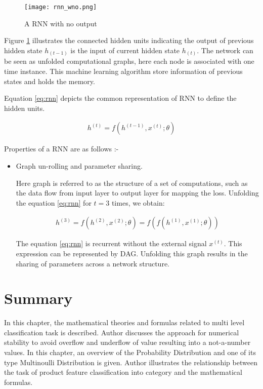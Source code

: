 \begin{figure}[H]
    \centering    
    \texttt{[image: rnn\_wno.png]}
    \caption{A \acl*{RNN} with no output \parencite[Page 370]{Goodfellow-et-al-2016}}
    \label{fig:RNN without output}
\end{figure}


Figure \ref{fig:RNN without output} illustrates the connected hidden units indicating the output of previous hidden state $h_{(t-1)}$ is the input of current hidden state $h_{(t)}$.  The network can be seen as unfolded computational graphs, here each node is associated with one time instance. This machine learning algorithm store information of previous states and holds the memory. 

Equation \ref{eq:rnn} depicts the common representation of RNN to define the hidden units.

\begin{align}
    h^{(t)} = f(h^{(t-1)}, x^{(t)}; \theta) \label{eq:rnn}
 \end{align}

Properties of a RNN are as follows \parencite[Chapter 10]{Goodfellow-et-al-2016}:- 
\begin{itemize}
    \item Graph un-rolling and parameter sharing.
    
    Here graph is referred to as the structure of a set of computations, such as the data flow from input layer to output layer for mapping the loss. Unfolding the equation \ref{eq:rnn} for $t=3$ times, we obtain:
    
    \begin{align}
        h^{(3)} = f(h^{(2)}, x^{(2)}; \theta) = f(f(h^{(1)},x^{(1)}; \theta)) \label{eq:rnn_new}
     \end{align}
    

    The equation \ref{eq:rnn} is recurrent without the external signal $x^{(t)}$. This expression can be represented by \acl{DAG}.  Unfolding this graph results in the sharing of parameters across a network structure.


\end{itemize}






\section{Summary}

In this chapter, the mathematical theories and formulas related to multi level classification task is described. Author discusses the approach for numerical stability to avoid overflow and underflow of value resulting into a not-a-number values. In this chapter, an overview of the Probability Distribution and one of its type Multinoulli Distribution is given. Author illustrates the relationship between the task of product feature classification into category and the mathematical formulas.  